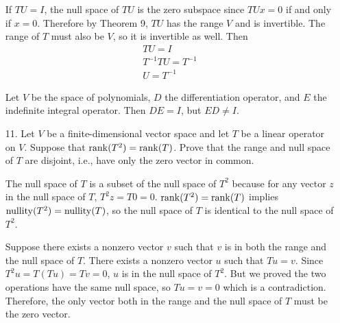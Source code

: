 \documentclass{article}
\begin{document}
\begin{enumerate}[listparindent=\parindent]
    If \(TU = I\), the null space of \(TU\) is the zero subspace since \(TUx = 0\) if and only if \(x = 0\).
    Therefore by Theorem 9, \(TU\) has the range \(V\) and is invertible.
    The range of \(T\) must also be \(V\), so it is invertible as well. Then
    \begin{gather*}
        TU = I \\
        T^{-1}TU = T^{-1} \\
        U = T^{-1}
    \end{gather*}

    Let \(V\) be the space of polynomials, \(D\) the differentiation operator, and \(E\) the indefinite integral operator.
    Then \(DE = I\), but \(ED \neq I\).

\item[11.] Let \(V\) be a finite-dimensional vector space and let \(T\) be a linear operator on \(V\).
    Suppose that \(\operatorname{rank}(T^2) = \operatorname{rank}(T)\). Prove that the range and null space of \(T\) are disjoint, i.e.,
    have only the zero vector in common.

    The null space of \(T\) is a subset of the null space of \(T^2\) because for any vector \(z\) in the null space of \(T\), \(T^2z = T0 = 0\).
    \(\operatorname{rank}(T^2) = \operatorname{rank}(T)\) implies \(\operatorname{nullity}(T^2) = \operatorname{nullity}(T)\), so the null space of \(T\) is identical to the null space of \(T^2\).

    Suppose there exists a nonzero vector \(v\) such that \(v\) is in both the range and the null space of \(T\).
    There exists a nonzero vector \(u\) such that \(Tu = v\). Since \(T^2u = T(Tu) = Tv = 0\), \(u\) is in the null space of \(T^2\).
    But we proved the two operations have the same null space, so \(Tu = v = 0\) which is a contradiction.
    Therefore, the only vector both in the range and the null space of \(T\) must be the zero vector.
\end{enumerate}
\end{document}
